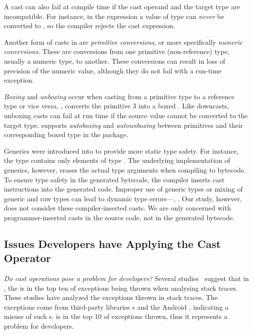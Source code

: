 A cast can also fail at compile time if the cast operand and the target type are incompatible.
For instance, in the expression  a value of type
 can \emph{never} be converted to , so the compiler
rejects the cast expression.

Another form of casts in \java{} are \emph{primitive conversions}, or more specifically
\emph{numeric conversions}. These are conversions from
one primitive (non-reference) type, usually a numeric type, to another. These conversions can result
in loss of precision of the numeric value, although they do not fail with a
run-time exception.

\emph{Boxing} and \emph{unboxing} occur when casting from a primitive type to
a reference type or vice versa, \eg,  converts the primitive
 3 into a boxed .
Like downcasts, unboxing casts can fail at
run time if the source value cannot be converted to the target type.
\java{} supports \emph{autoboxing} and \emph{autounboxing} between primitives and their corresponding
boxed type in the  package.

Generics were introduced into \java{} to provide more static type safety.
For instance, the type  contains only elements of type .
The underlying implementation of generics, however, erases the actual type
arguments when compiling to bytecode. To ensure type safety in the generated
bytecode, the compiler inserts cast instructions into the generated code.
Improper use of generic types or mixing of generic and raw types can lead
to dynamic type errors---\ie, .
Our study, however, does not consider these compiler-inserted casts. We are only concerned with
programmer-inserted casts in the source code, not in the generated bytecode.

\subsection*{Issues Developers have Applying the Cast Operator}

\emph{Do cast operations pose a problem for developers?}
Several studies~\citep{kechagiaUndocumentedUncheckedExceptions2014,coelhoUnveilingExceptionHandling2015,zhitnitskyTop10Exception2016}
suggest that in \java{},
the  is in the top ten of exceptions being thrown when analysing stack traces.
These studies have analyzed the exceptions thrown in stack traces.
The exceptions come from third-party libraries \api{}s and the Android \api{},
indicating a misuse of such \api{}s.
 is in the top 10 of exceptions thrown,
thus it represents a problem for developers.

